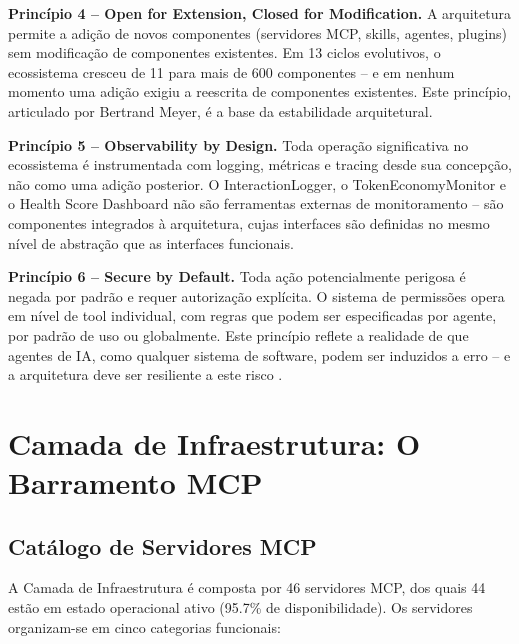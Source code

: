 \documentclass[12pt,a4paper,sumario=tradicional,openany]{abntex2}
\begin{document}
\textbf{Princípio 4 -- Open for Extension, Closed for Modification.} A arquitetura permite a adição de novos componentes (servidores MCP, skills, agentes, plugins) sem modificação de componentes existentes. Em 13 ciclos evolutivos, o ecossistema cresceu de 11 para mais de 600 componentes -- e em nenhum momento uma adição exigiu a reescrita de componentes existentes. Este princípio, articulado por Bertrand Meyer, é a base da estabilidade arquitetural.

\textbf{Princípio 5 -- Observability by Design.} Toda operação significativa no ecossistema é instrumentada com logging, métricas e tracing desde sua concepção, não como uma adição posterior. O InteractionLogger, o TokenEconomyMonitor e o Health Score Dashboard não são ferramentas externas de monitoramento -- são componentes integrados à arquitetura, cujas interfaces são definidas no mesmo nível de abstração que as interfaces funcionais.

\textbf{Princípio 6 -- Secure by Default.} Toda ação potencialmente perigosa é negada por padrão e requer autorização explícita. O sistema de permissões opera em nível de tool individual, com regras que podem ser especificadas por agente, por padrão de uso ou globalmente. Este princípio reflete a realidade de que agentes de IA, como qualquer sistema de software, podem ser induzidos a erro -- e a arquitetura deve ser resiliente a este risco \cite{bowers2025analyzing}.

\section{Camada de Infraestrutura: O Barramento MCP}

\subsection{Catálogo de Servidores MCP}

A Camada de Infraestrutura é composta por 46 servidores MCP, dos quais 44 estão em estado operacional ativo (95.7\% de disponibilidade). Os servidores organizam-se em cinco categorias funcionais:
\end{document}
